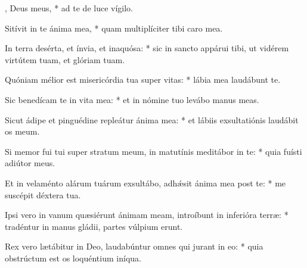 \begin{psalmus}

, Deus meus, * ad te de luce vígilo.

Sitívit in te ánima mea, * quam multiplíciter tibi caro mea.

In terra desérta, et ínvia, et inaquósa: * sic in sancto appárui tibi, ut vidérem virtútem tuam, et glóriam tuam.

Quóniam mélior est misericórdia tua super vitas: * lábia mea laudábunt te.

Sic benedícam te in vita mea: * et in nómine tuo levábo manus meas.

Sicut ádipe et pinguédine repleátur ánima mea: * et lábiis exsultatiónis laudábit os meum.

Si memor fui tui super stratum meum, in matutínis meditábor in te: * quia fuísti adiútor meus.

Et in velaménto alárum tuárum exsultábo, adhǽsit ánima mea post te: * me suscépit déxtera tua.

Ipsi vero in vanum quæsiérunt ánimam meam, introíbunt in inferióra terræ: * tradéntur in manus gládii, partes vúlpium erunt.

Rex vero lætábitur in Deo, laudabúntur omnes qui jurant in eo: * quia obstrúctum est os loquéntium iníqua.

\end{psalmus}
